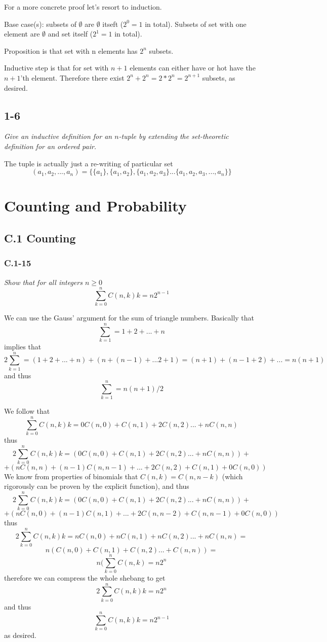 \documentclass[11pt,oneside,titlepage]{book}
\begin{document}
For a more concrete proof let's resort to induction.

Base case(s): subsets of $\emptyset$ are $\emptyset$ itseft
($2^0 = 1$ in total). Subsets of
set with one element are $\emptyset$ and set itself ($2^1 = 1$ in total).

Proposition is that set with n elements has $2^n$ subsets.

Inductive step is that for set with $n + 1$ elements can either have or hot
have the $n + 1$'th element. Therefore there exist $2^n + 2^n = 2 * 2^n =
2^{n + 1}$ subsets, as desired.

\section*{1-6}
\textit{Give an inductive definition for an $n$-tuple by extending the
  set-theoretic definition for an ordered pair.}

The tuple is actually just a re-writing of particular set
$$(a_1, a_2, ..., a_n) = \{\{a_1\}, \{a_1, a_2\}, \{a_1, a_2, a_3\} ...
\{a_1, a_2, a_3, ..., a_n\}\}$$

\chapter{Counting and Probability}

\section*{C.1 Counting}

\subsection*{C.1-15}

\textit{Show that for all integers $n \geq 0$
  $$\sum_{k = 0}^n{C(n, k) k} = n 2^{n - 1}$$
}

We can use the Gauss' argument for the sum of triangle numbers. Basically that
$$\sum_{k = 1}^n = 1 + 2 + ... + n$$
implies that 
$$2 \sum_{k = 1}^n = (1 + 2 + ... + n) + (n + (n - 1) + ... 2 + 1) =
(n + 1)  + (n - 1 + 2) + ... = n(n + 1) $$
and thus
$$\sum_{k = 1}^n = n(n + 1)/2$$

We follow that
$$\sum_{k = 0}^n{C(n, k) k} = 0 C(n, 0) +  C(n, 1) + 2 C(n, 2) ... + n C(n, n)$$
thus
$$2 \sum_{k = 0}^n{C(n, k) k} = (0 C(n, 0) +  C(n, 1) + 2 C(n, 2) ... + n C(n, n)) + $$
$$ + 
(n C(n, n) +  (n - 1)C(n, n - 1) + ... + 2 C(n, 2) + C(n, 1) + 0 C(n, 0))$$
We know from properties of binomials that $C (n, k) = C(n, n - k)$ (which rigorously can
be proven by the explicit function), and thus
$$2 \sum_{k = 0}^n{C(n, k) k} = (0 C(n, 0) +  C(n, 1) + 2 C(n, 2) ... + n C(n, n)) + $$
$$ + 
(n C(n, 0) +  (n - 1)C(n, 1) + ... + 2 C(n, n - 2) + C(n, n - 1) + 0C(n, 0))$$
thus
$$2 \sum_{k = 0}^n{C(n, k) k} = n C(n, 0) +  n C(n, 1) + n C(n, 2) ... + n C(n, n) = $$
$$ n (C(n, 0) +   C(n, 1) +  C(n, 2) ... +  C(n, n)) = $$
$$ n(\sum_{k = 0}^n{C(n, k)} = n 2^n$$
therefore we can compress the whole shebang to get
$$2 \sum_{k = 0}^n{C(n, k) k} = n 2^n$$
and thus
$$\sum_{k = 0}^n{C(n, k) k} = n 2^{n - 1}$$
as desired.
\end{document}
